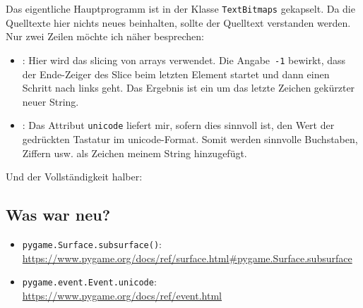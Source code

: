 Das eigentliche Hauptprogramm ist in der Klasse \texttt{TextBitmaps} gekapselt. Da die Quelltexte hier nichts neues beinhalten, sollte der Quelltext verstanden werden. Nur zwei Zeilen möchte ich näher besprechen:

\begin{itemize}
    \item {}: Hier wird das \gls{slicing} von \glspl{array} verwendet. Die Angabe~\texttt{-1} bewirkt, dass der Ende-Zeiger des Slice beim letzten Element startet und dann einen Schritt nach links geht. Das Ergebnis ist ein um das letzte Zeichen gekürzter neuer String.

    \item {}: Das Attribut \texttt{unicode} liefert mir, sofern dies sinnvoll ist, den Wert der gedrückten Tastatur im \gls{unicode}-Format. Somit werden sinnvolle Buchstaben, Ziffern usw. als Zeichen meinem String hinzugefügt.
\end{itemize}


Und der Vollständigkeit halber:



\subsection*{Was war neu?}


\begin{itemize}
	\item \texttt{pygame.Surface.subsurface()}:
	\\ \url{https://www.pygame.org/docs/ref/surface.html#pygame.Surface.subsurface}
	
	\item \texttt{pygame.event.Event.unicode}:
	\\ \url{https://www.pygame.org/docs/ref/event.html}

\end{itemize}

